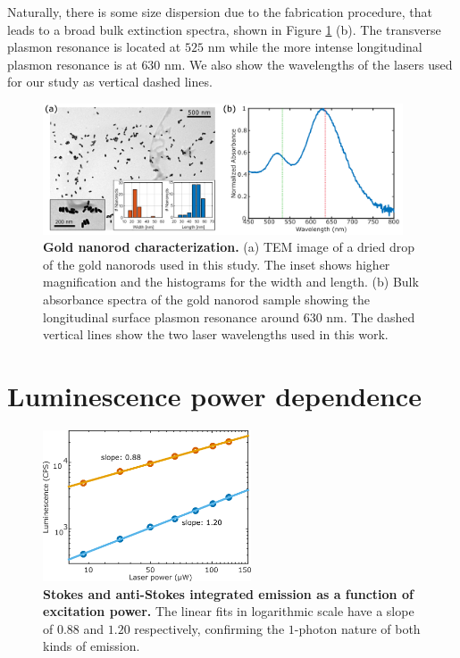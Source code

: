 \documentclass[journal=nalefd,manuscript=letter]{achemso}
\begin{document}
Naturally, there is some size dispersion due to the fabrication procedure, that leads to a broad bulk extinction 
spectra, shown in Figure \ref{fg:nr-char} (b). The transverse plasmon resonance is located at 
$525$ nm while the more intense longitudinal plasmon resonance is at $630$ nm. We also show 
the wavelengths of the lasers used for our study as vertical dashed lines. 

\begin{figure}[htp] \centering
\includegraphics[width=0.95\textwidth]{Figures/Supplementary/07_GNRs_Characterization_TEM/GNRs_characterization.png}
\caption{\textbf{Gold nanorod characterization.} (a) TEM image of a dried drop of  the gold nanorods used in this study.  The inset shows higher magnification and the histograms for the width and length.
(b) Bulk absorbance spectra of the gold nanorod sample showing the longitudinal surface plasmon resonance around $630$ nm. The dashed vertical lines show the two laser wavelengths used in this work.}
	\label{fg:nr-char}
\end{figure}



\pagebreak
\section{Luminescence power dependence}

\begin{figure}[htp] \centering
\includegraphics[width=0.55\textwidth]{Figures/Supplementary/03_AS_S_in_Log/03_AS_S_in_Log.png}
\caption{\textbf{Stokes and anti-Stokes integrated emission as a function of excitation power.} The
linear fits in logarithmic scale have a slope of $0.88$ and $1.20$ respectively,
confirming the $1$-photon nature of both kinds of emission.}
	\label{fig:Log_Plot}
\end{figure}
\end{document}

